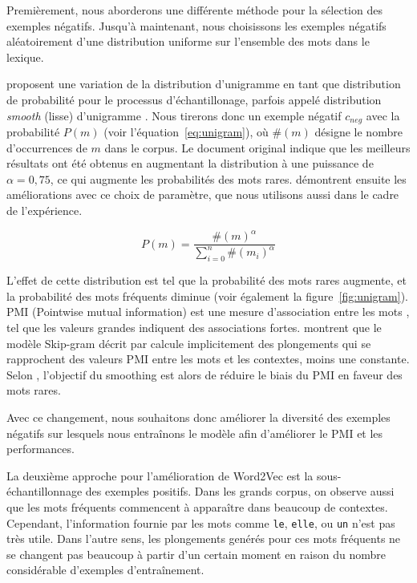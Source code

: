 \documentclass[12pt]{article}
\begin{document}
Premièrement, nous aborderons une différente méthode pour la sélection des exemples négatifs. Jusqu'à maintenant, nous choisissons les exemples négatifs aléatoirement d'une distribution uniforme sur l'ensemble des mots dans le lexique. 

\cite{DBLP:conf/nips/MikolovSCCD13} proposent une variation de la distribution d'unigramme en tant que distribution de probabilité pour le processus d'échantillonage, parfois appelé distribution \textit{smooth} (lisse) d'unigramme \citep{levy2015improving}. Nous tirerons donc un exemple négatif $c_{neg}$ avec la probabilité $P(m)$ (voir l'équation~\ref{eq:unigram}), où $\#(m)$ désigne le nombre d'occurrences de $m$ dans le corpus. Le document original indique que les meilleurs résultats ont été obtenus en augmentant la distribution à une puissance de $\alpha = 0{,}75$, ce qui augmente les probabilités des mots rares. \cite{levy2015improving} démontrent ensuite les améliorations avec ce choix de paramètre, que nous utilisons aussi dans le cadre de l'expérience.

\begin{equation}\label{eq:unigram}
P(m) = \frac{\#(m)^{\alpha}}{\sum_{i=0}^n \#(m_i)^{\alpha}}
\end{equation}

L'effet de cette distribution est tel que la probabilité des mots rares augmente, et la probabilité des mots fréquents diminue (voir également la figure~\ref{fig:unigram}). PMI (Pointwise mutual information) est une mesure d'association entre les mots \citep{jurafsky2000speech}, tel que les valeurs grandes indiquent des associations fortes. \cite{levy2014neural} montrent que le modèle Skip-gram décrit par \cite{DBLP:conf/nips/MikolovSCCD13} calcule implicitement des plongements qui se rapprochent des valeurs PMI entre les mots et les contextes, moins une constante. Selon \cite{levy2015improving}, l'objectif du smoothing est alors de réduire le biais du PMI en faveur des mots rares. 

Avec ce changement, nous souhaitons donc améliorer la diversité des exemples négatifs sur lesquels nous entraînons le modèle afin d'améliorer le PMI et les performances.

La deuxième approche pour l'amélioration de Word2Vec est la sous-échantillonnage des exemples positifs. Dans les grands corpus, on observe aussi que les mots fréquents commencent à apparaître dans beaucoup de contextes. Cependant, l'information fournie par les mots comme \texttt{le}, \texttt{elle}, ou \texttt{un} n'est pas très utile. Dans l'autre sens, les plongements genérés pour ces mots fréquents ne se changent pas beaucoup à partir d'un certain moment en raison du nombre considérable d'exemples d'entraînement. 
\end{document}
